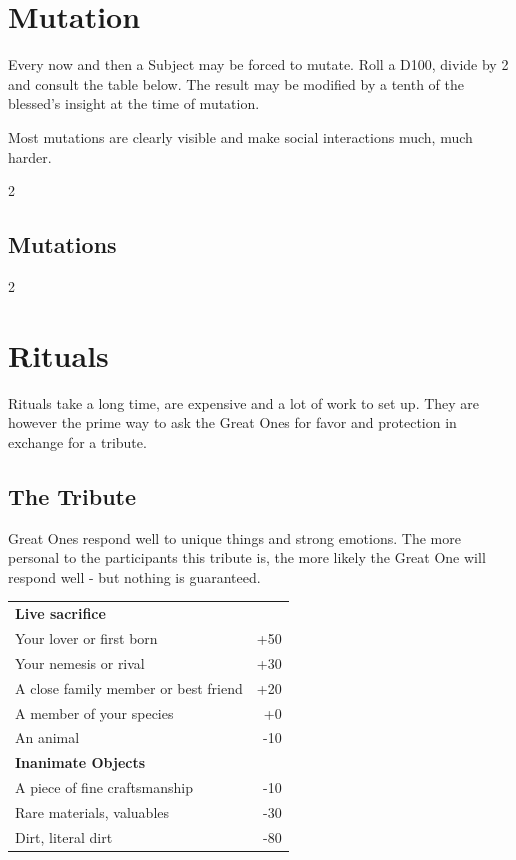 \documentclass[11pt,a4paper,openany]{book}
\begin{document}
	\chapter{Mutation}
	\label{ch:mutation}
	\vspace{-20mm}%
	Every now and then a Subject may be forced to mutate.
	Roll a D100, divide by 2 and consult the table below.
	The result may be modified by a tenth of the blessed's insight at the time of mutation.
	\begin{exampleblock}
		Most mutations are clearly visible and make social interactions much, much harder.
	\end{exampleblock}
	\begin{multicols}{2}
		\begin{enumerate}
			\setlength\itemsep{-10mm}
		\end{enumerate}
	\end{multicols}
	
	\section*{Mutations}
	\vspace{4mm}
	\begin{multicols}{2}
		\raggedcolumns
	\end{multicols}
	
	\chapter{Rituals}
	\label{ch:rituals}
	Rituals take a long time, are expensive and a lot of work to set up. They are however the prime way to ask the Great Ones for favor and protection in exchange for a tribute.
	\section{The Tribute}
	Great Ones respond well to unique things and strong emotions. The more personal to the participants this tribute is, the more likely the Great One will respond well - but nothing is guaranteed.
	\par
	\begin{center}
	\begin{tabular}{lr}
		\textbf{Live sacrifice} & \\
		Your lover or first born & +50 \\
		Your nemesis or rival & +30 \\
		A close family member or best friend & +20 \\
		A member of your species & +0 \\
		An animal & -10 \\
		\hline
		\textbf{Inanimate Objects} & \\
		A piece of fine craftsmanship & -10 \\
		Rare materials, valuables & -30 \\
		Dirt, literal dirt & -80
	\end{tabular}
	\end{center}
\end{document}
